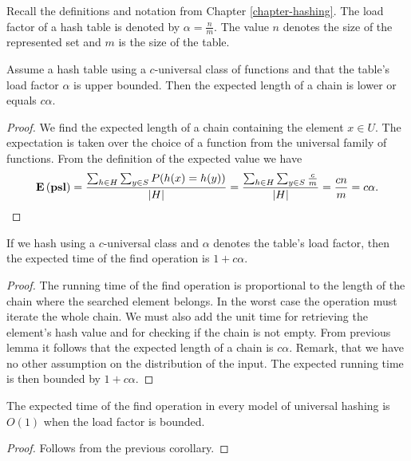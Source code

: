 Recall the definitions and notation from Chapter \ref{chapter-hashing}. The load factor of a hash table is denoted by $\alpha = \frac{n}{m}$. The value $n$ denotes the size of the represented set and $m$ is the size of the table.

\begin{theorem}
\label{theorem-expected-chain-length-universal}
Assume a hash table using a $c$-universal class of functions and that the table's load factor $\alpha$ is upper bounded. Then the expected length of a chain is lower or equals $c \alpha$.
\end{theorem}
\begin{proof}
We find the expected length of a chain containing the element $x \in U$. The expectation is taken over the choice of a function from the universal family of functions. From the definition of the expected value we have
\begin{displaymath}
\mathbf{E}\left(\mathbf{psl}\right) = \frac{\sum\displaylimits_{h \in H} \sum\displaylimits_{y \in S} P(h(x) = h(y))}{|H|} = \frac{\sum\displaylimits_{h \in H} \sum\displaylimits_{y \in S} \frac{c}{m}}{|H|} = \frac{cn}{m} = c \alpha \text{.}
\end{displaymath}
\end{proof}

\begin{corollary}
If we hash using a $c$-universal class and $\alpha$ denotes the table's load factor, then the expected time of the find operation is $1 + c\alpha$.
\end{corollary}
\begin{proof}
The running time of the find operation is proportional to the length of the chain where the searched element belongs. In the worst case the operation must iterate the whole chain. We must also add the unit time for retrieving the element's hash value and for checking if the chain is not empty. From previous lemma it follows that the expected length of a chain is $c\alpha$. Remark, that we have no other assumption on the distribution of the input. The expected running time is then bounded by $1 + c\alpha$. 
\end{proof}

\begin{corollary}
\label{corollary-find-time}
The expected time of the find operation in every model of universal hashing is $O(1)$ when the load factor is bounded.
\end{corollary}
\begin{proof}
Follows from the previous corollary.
\end{proof}

